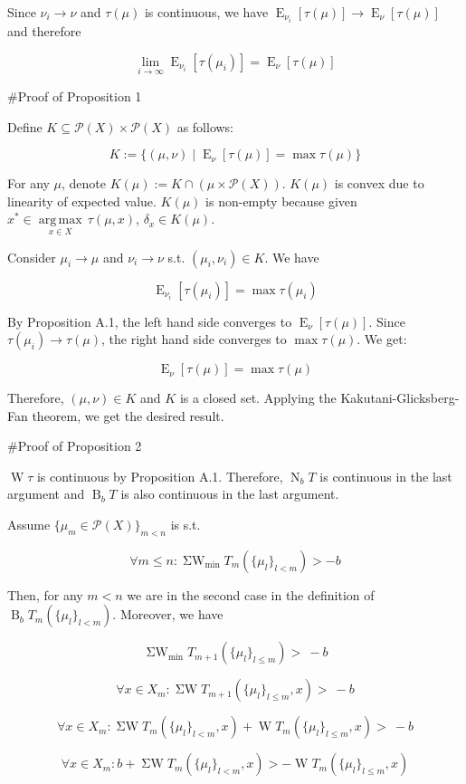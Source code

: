 \documentclass[a4paper]{article}
\DeclareMathOperator{\E}{E}
\newcommand{\Argmax}[1]{\underset{#1}{\operatorname{arg\,max}}\,}
\newcommand{\Prob}{\mathcal{P}}
\newcommand{\B}{\operatorname{B}_b}
\newcommand{\N}{\operatorname{N}_b}
\newcommand{\W}{\operatorname{W}}
\newcommand{\SW}{\operatorname{\Sigma W}}
\newcommand{\SWm}{\operatorname{\Sigma W}_{\min}}
\begin{document}
Since ${\nu_i \rightarrow \nu}$ and ${\tau(\mu)}$ is continuous, we have ${\E_{\nu_i}[\tau(\mu)] \rightarrow \E_{\nu}[\tau(\mu)]}$ and therefore

$$\lim_{i \rightarrow \infty} \E_{\nu_i}[\tau(\mu_i)] = \E_{\nu}[\tau(\mu)]$$

\#Proof of Proposition 1

Define ${K \subseteq \Prob(X) \times \Prob(X)}$ as follows:

$$K:=\{(\mu,\nu) \mid \E_\nu[\tau(\mu)] = \max \tau(\mu)\}$$

For any ${\mu}$, denote ${K(\mu):=K \cap (\mu \times \Prob(X))}$. ${K}(\mu)$ is convex due to linearity of expected value. ${K(\mu)}$ is non-empty because given ${x^* \in \Argmax{x \in X} \tau(\mu,x)}$, ${\delta_x \in K(\mu)}$.

Consider ${\mu_i \rightarrow \mu}$ and ${\nu_i \rightarrow \nu}$ s.t. ${(\mu_i,\nu_i) \in K}$. We have

$$\E_{\nu_i}[\tau(\mu_i)] = \max \tau(\mu_i)$$

By Proposition A.1, the left hand side converges to ${\E_{\nu}[\tau(\mu)]}$. Since ${\tau(\mu_i) \rightarrow \tau(\mu)}$, the right hand side converges to ${\max \tau(\mu)}$. We get:

$$\E_{\nu}[\tau(\mu)] = \max \tau(\mu)$$

Therefore, ${(\mu,\nu) \in K}$ and ${K}$ is a closed set. Applying the Kakutani-Glicksberg-Fan theorem, we get the desired result.

\#Proof of Proposition 2

${\W \tau}$ is continuous by Proposition A.1. Therefore, ${\N T}$ is continuous in the last argument and ${\B T}$ is also continuous in the last argument.

Assume ${\{\mu_m \in \Prob(X)\}_{m<n}}$ is s.t. 

$$\forall m \leq n: \SWm T_m(\{\mu_l\}_{l<m}) > -b$$ 

Then, for any ${m < n}$ we are in the second case in the definition of ${\B T_m(\{\mu_l\}_{l<m})}$. Moreover, we have

$$\SWm T_{m+1}(\{\mu_l\}_{l \leq m}) >\ -b$$

$$\forall x \in X_{m}: \SW T_{m+1}(\{\mu_l\}_{l \leq m}, x) >\ -b$$

$$\forall x \in X_{m}: \SW T_{m}(\{\mu_l\}_{l < m}, x) + \W T_{m}(\{\mu_l\}_{l \leq m}, x)  >\ -b$$

$$\forall x \in X_{m}: b + \SW T_{m}(\{\mu_l\}_{l < m}, x) > -\W T_{m}(\{\mu_l\}_{l \leq m}, x)$$
\end{document}
